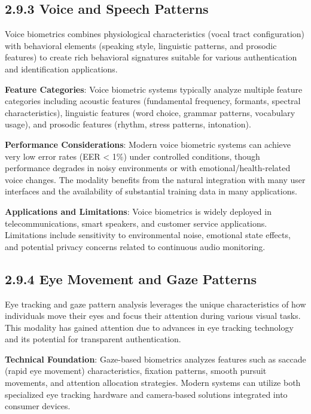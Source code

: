 \documentclass[
  12pt,
  a4paper,
]{report}
\begin{document}
\subsection{2.9.3 Voice and Speech
Patterns}\label{voice-and-speech-patterns}

Voice biometrics combines physiological characteristics (vocal tract
configuration) with behavioral elements (speaking style, linguistic
patterns, and prosodic features) to create rich behavioral signatures
suitable for various authentication and identification applications.

\textbf{Feature Categories}: Voice biometric systems typically analyze
multiple feature categories including acoustic features (fundamental
frequency, formants, spectral characteristics), linguistic features
(word choice, grammar patterns, vocabulary usage), and prosodic features
(rhythm, stress patterns, intonation).

\textbf{Performance Considerations}: Modern voice biometric systems can
achieve very low error rates (EER \textless{} 1\%) under controlled
conditions, though performance degrades in noisy environments or with
emotional/health-related voice changes. The modality benefits from the
natural integration with many user interfaces and the availability of
substantial training data in many applications.

\textbf{Applications and Limitations}: Voice biometrics is widely
deployed in telecommunications, smart speakers, and customer service
applications. Limitations include sensitivity to environmental noise,
emotional state effects, and potential privacy concerns related to
continuous audio monitoring.

\subsection{2.9.4 Eye Movement and Gaze
Patterns}\label{eye-movement-and-gaze-patterns}

Eye tracking and gaze pattern analysis leverages the unique
characteristics of how individuals move their eyes and focus their
attention during various visual tasks. This modality has gained
attention due to advances in eye tracking technology and its potential
for transparent authentication.

\textbf{Technical Foundation}: Gaze-based biometrics analyzes features
such as saccade (rapid eye movement) characteristics, fixation patterns,
smooth pursuit movements, and attention allocation strategies. Modern
systems can utilize both specialized eye tracking hardware and
camera-based solutions integrated into consumer devices.
\end{document}
